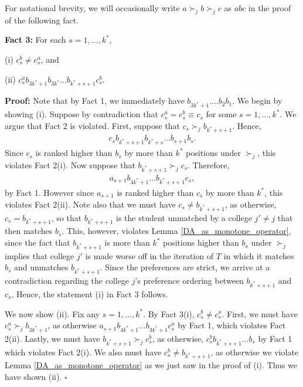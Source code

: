 \documentclass[12pt, fullpage]{amsart}
\theoremstyle{definition}
\theoremstyle{definition}
\theoremstyle{definition}
\begin{document}
\begin{bibunit}[econometrica]
For notational brevity, we will occasionally write $a\succ_j b \succ_j c$ as $abc$ in the proof of the following fact. \medskip

\noindent \textbf{Fact 3:} For each $s=1,...,k^{*}$, 

(i) $c_{s}^{b}\ne c_{s}^{a}$, and 

(ii) $c_{s}^{a}b_{3k^{*}+1}b_{3k^{*}}...b_{k^{*}+s+1}c_{s}^{b}$.\medskip

\noindent \textbf{Proof:} Note that by Fact 1, we immediately have $b_{3k^{*}+1}....b_{2}b_{1}$. We begin by showing (i).   Suppose by contradiction that $c_{s}^{a}=c_{s}^{b}\equiv c_{s}$ for some $s=1,...,k^{*}$. We argue that Fact 2 is violated. First, suppose that $c_{s}\succ_{j}b_{k^{*}+s+1}$.  Hence, 
\begin{align*}\label{f3csacsbi}
	c_{s}b_{k^{*}+s+1}b_{k^{*}+s}...b_{s+1}b_{s}.
\end{align*}
Since $c_{s}$ is ranked higher than $b_{s}$ by more than $k^{*}$ positions under $\succ_{j}$, this violates Fact 2(i). Now suppose that $b_{k^{*}+s+1}\succ_{j}c_{s}$. Therefore, 
\begin{align}
	a_{s+1}b_{4k^{*}+1}...b_{k^{*}+s+1}c_{s},
\end{align}
by Fact 1. However since $a_{s+1}$ is ranked higher than $c_{s}$ by more than $k^{*}$, this violates Fact 2(ii). Note also that we must have $c_{s}\ne b_{k^{*}+s+1}$, as otherwise, $c_{s}=b_{k^{*}+s+1}$, so that $b_{k^{*}+s+1}$ is the student unmatched by a college $j'\ne j$ that then matches $b_{s}$. This, however, violates Lemma \ref{DA_as_monotone_operator}, since the fact that $b_{k^{*}+s+1}$ is more than $k^{*}$ positions higher than $b_{s}$ under $\succ_{j}$ implies that college $j'$ is made worse off in the iteration of $T$ in which it matches $b_{s}$ and unmatches $b_{k^{*}+s+1}$. Since the preferences are strict, we arrive at a contradiction regarding the college $j$'s preference ordering between $b_{k^*+ s + 1}$ and $c_s$. Hence, the statement (i) in Fact 3 follows.  

We now show (ii). Fix any $s=1,...,k^{*}$.  By Fact 3(i), $c_{s}^{b}\ne c_{s}^{a}$.  First, we must have $c_{s}^{a}\succ_jb_{3k^{*}+1}$, as otherwise  $a_{s+1}b_{4k^{*}+1}...b_{3k^{*}+1}c_{s}^{a}$ by Fact 1, which violates Fact 2(ii). Lastly, we must have   $b_{k^{*}+s+1}\succ_j c_{s}^{b}$, as otherwise, $c_{s}^{b}b_{k^{*}+s+1}...b_{s}$  by Fact 1 which violates Fact 2(i). We also must have $c_{s}^b\ne b_{k^{*}+s+1}$, as otherwise we violate  Lemma \ref{DA_as_monotone_operator} as we just saw in the proof of (i). Thus we have shown (ii). $\square$ \medskip


\end{bibunit}
\end{document}
